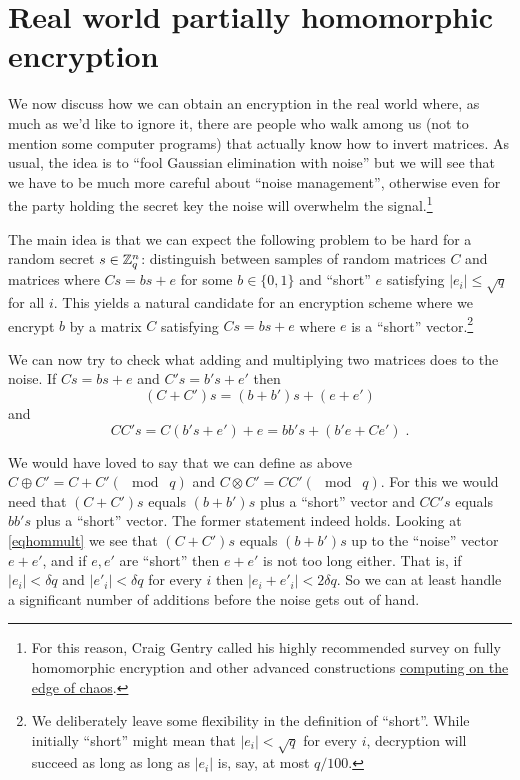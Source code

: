 \section{Real world partially homomorphic
encryption}\label{Real-world-partially-homomorph}

We now discuss how we can obtain an encryption in the real world where,
as much as we'd like to ignore it, there are people who walk among us
(not to mention some computer programs) that actually know how to invert
matrices. As usual, the idea is to ``fool Gaussian elimination with
noise'' but we will see that we have to be much more careful about
``noise management'', otherwise even for the party holding the secret
key the noise will overwhelm the signal.\footnote{For this reason, Craig
  Gentry called his highly recommended survey on fully homomorphic
  encryption and other advanced constructions
  \href{https://eprint.iacr.org/2014/610}{computing on the edge of
  chaos}.}

The main idea is that we can expect the following problem to be hard for
a random secret \(s\in{\mathbb{Z}}_q^n\): distinguish between samples of random
matrices \(C\) and matrices where \(Cs = bs + e\) for some
\(b\in\{0,1\}\) and ``short'' \(e\) satisfying \(|e_i| \leq \sqrt{q}\)
for all \(i\). This yields a natural candidate for an encryption scheme
where we encrypt \(b\) by a matrix \(C\) satisfying \(Cs = bs + e\)
where \(e\) is a ``short'' vector.\footnote{We deliberately leave some
  flexibility in the definition of ``short''. While initially ``short''
  might mean that \(|e_i|<\sqrt{q}\) for every \(i\), decryption will
  succeed as long as long as \(|e_i|\) is, say, at most \(q/100\).}

We can now try to check what adding and multiplying two matrices does to
the noise. If \(Cs = bs+e\) and \(C's=b's+e'\) then
\[(C+C')s = (b+b')s+(e+e') \label{eqhomadd}\] and
\[\ensuremath{\mathit{CC}}'s = C(b's+e')+e =bb's+ (b'e+Ce')\;. \label{eqhommult} \]


We would have loved to say that we can define as above
\(C\oplus C' = C+C' (\mod\; q)\) and
\(C\otimes C' = \ensuremath{\mathit{CC}}' (\mod \; q)\). For this we
would need that \((C+C')s\) equals \((b+b')s\) plus a ``short'' vector
and \(\ensuremath{\mathit{CC}}'s\) equals \(bb's\) plus a ``short''
vector. The former statement indeed holds. Looking at \eqref{eqhommult}
we see that \((C+C')s\) equals \((b+b')s\) up to the ``noise'' vector
\(e+e'\), and if \(e,e'\) are ``short'' then \(e+e'\) is not too long
either. That is, if \(|e_i|<\delta q\) and \(|e'_i|<\delta q\) for every
\(i\) then \(|e_i+e'_i|<2\delta q\). So we can at least handle a
significant number of additions before the noise gets out of hand.

